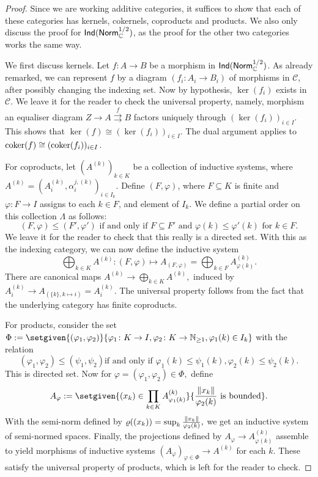 \begin{proof}
    Since we are working additive categories, it suffices to show that each of these categories has kernels, cokernels, coproducts and products. We also only discuss the proof for \(\mathsf{Ind}(\mathsf{Norm}_\mathbb C^{1/2})\), as the proof for the other two categories works the same way.

We first discuss kernels. Let \(f \colon A \to B\) be a morphism in \(\mathsf{Ind}(\mathsf{Norm}_\mathbb C^{1/2})\). As already remarked, we can represent \(f\) by a diagram \((f_i \colon A_i \to B_i)\) of morphisms in \(\mathcal{C}\), after possibly changing the indexing set. Now by hypothesis, \(\ker(f_i)\) exists in \(\mathcal{C}\). We leave it for the reader to check the universal property, namely, morphism an equaliser diagram \(Z \to A \overset{f}\rightrightarrows B\) factors uniquely through \((\ker(f_i))_{i \in I}\). This shows that \(\ker(f) \cong (\ker(f_i))_{i \in I}\). The dual argument applies to \(\operatorname{coker}(f) \cong (\operatorname{coker}(f_i))_{i \in I}\).  

For coproducts, let \((A^{(k)})_{k \in K}\) be a collection of inductive systems, where \(A^{(k)} = (A_i^{(k)}, \alpha_i^{j,(k)})_{i \in I_k}\). Define \((F,\varphi)\), where \(F \subseteq K\) is finite and \(\varphi \colon F \to I\) assigns to each \(k \in F\), and element of \(I_k\). We define a partial order on this collection \(\Lambda\) as follows: \[(F,\varphi) \leq (F',\varphi') \text{ if and only if } F \subseteq F' \text{ and } \varphi(k) \leq \varphi'(k) \text{ for } k \in F.\] We leave it for the reader to check that this really is a directed set. With this as the indexing category, we can now define the inductive system \[\bigoplus_{k \in K} A^{(k)} \colon (F,\varphi) \mapsto A_{(F, \varphi)} = \bigoplus_{k \in F}A_{\varphi(k)}^{(k)}.\] There are canonical maps \(A^{(k)} \to \bigoplus_{k \in K}A^{(k)},\) induced by \(A_i^{(k)} \to A_{(\{k\}, k \mapsto i)} = A_i^{(k)}.\) The universal property follows from the fact that the underlying category has finite coproducts.

For products, consider the set \(\Phi \defeq \setgiven{(\varphi_1,\varphi_2)}{\varphi_1 \colon K \to I, \varphi_2 \colon K \to \N_{\geq 1}, \varphi_1(k) \in I_k}\) with the relation 
\[(\varphi_1, \varphi_2) \leq (\psi_1, \psi_2) \text{if and only if } \varphi_1(k) \leq \psi_1(k), \varphi_2(k) \leq \psi_2(k).\] This is directed set. Now for \(\varphi = (\varphi_1, \varphi_2) \in \Phi,\) define \[A_\varphi \defeq \setgiven{(x_k) \in \prod_{k \in K} A_{\varphi_1(k)}^{(k)}}{\frac{\norm{x_k}}{\varphi_2(k)} \text{ is bounded}}.\] With the semi-norm defined by \(\varrho((x_k)) = \sup_{k} \frac{\lVert x_k\rVert}{\varphi_2(k)},\) we get an inductive system of semi-normed spaces. Finally, the projections defined by \(A_{\varphi} \to A_{\varphi(k)}^{(k)}\) assemble to yield morphisms of inductive systems \((A_{\varphi})_{\varphi \in \Phi} \to A^{(k)}\) for each \(k\). These satisfy the universal property of products, which is left for the reader to check.  
\end{proof}


